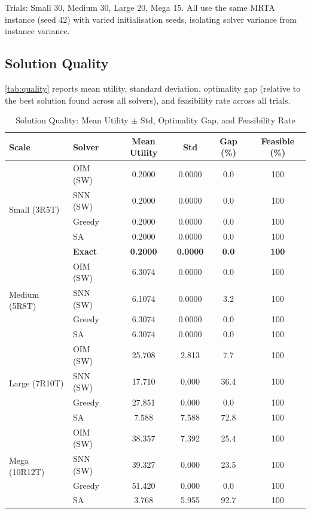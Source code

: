 Trials: Small 30, Medium 30, Large 20, Mega 15.  All use the same MRTA
instance (seed 42) with varied initialisation seeds, isolating solver variance
from instance variance.

\subsection{Solution Quality}

\autoref{tab:quality} reports mean utility, standard deviation, optimality
gap (relative to the best solution found across all solvers), and feasibility
rate across all trials.

\begin{table}[!htpb]
\caption{Solution Quality: Mean Utility $\pm$ Std, Optimality Gap, and
  Feasibility Rate}
\label{tab:quality}
\centering\small
\begin{tabular}{llcccc}
\toprule
\textbf{Scale} & \textbf{Solver} & \textbf{Mean Utility} &
  \textbf{Std} & \textbf{Gap (\%)} & \textbf{Feasible (\%)} \\
\midrule
\multirow{5}{*}{Small (3R5T)}
  & OIM (SW)   & 0.2000 & 0.0000 & 0.0 & 100 \\
  & SNN (SW)   & 0.2000 & 0.0000 & 0.0 & 100 \\
  & Greedy     & 0.2000 & 0.0000 & 0.0 & 100 \\
  & SA         & 0.2000 & 0.0000 & 0.0 & 100 \\
  & \textbf{Exact}     & \textbf{0.2000} & \textbf{0.0000} & \textbf{0.0} & \textbf{100} \\
\midrule
\multirow{4}{*}{Medium (5R8T)}
  & OIM (SW)   & 6.3074 & 0.0000 & 0.0  & 100 \\
  & SNN (SW)   & 6.1074 & 0.0000 & 3.2  & 100 \\
  & Greedy     & 6.3074 & 0.0000 & 0.0  & 100 \\
  & SA         & 6.3074 & 0.0000 & 0.0  & 100 \\
\midrule
\multirow{4}{*}{Large (7R10T)}
  & OIM (SW)   & 25.708 & 2.813  &  7.7 & 100 \\
  & SNN (SW)   & 17.710 & 0.000  & 36.4 & 100 \\
  & Greedy     & 27.851 & 0.000  &  0.0 & 100 \\
  & SA         &  7.588 & 7.588  & 72.8 & 100 \\
\midrule
\multirow{4}{*}{Mega (10R12T)}
  & OIM (SW)   & 38.357 & 7.392  & 25.4 & 100 \\
  & SNN (SW)   & 39.327 & 0.000  & 23.5 & 100 \\
  & Greedy     & 51.420 & 0.000  &  0.0 & 100 \\
  & SA         &  3.768 & 5.955  & 92.7 & 100 \\
\bottomrule
\end{tabular}
\end{table}

